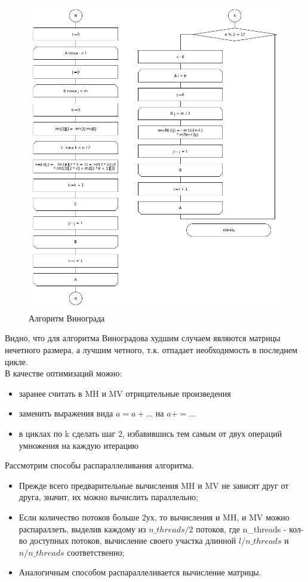 \documentclass[a4paper,12pt]{article}
\begin{document}
	 		\begin{figure}[H]
	 			\centering
	 			{
	 				\includegraphics[scale=0.61]{vinograd2.png}
	 				\caption{\label{ris:vin2}Алгоритм Винограда}	
	 			}
	 		\end{figure}
	
	Видно, что для алгоритма Виноградова худшим случаем являются матрицы нечетного размера, а лучшим четного, т.к. отпадает необходимость в последнем цикле.\\
	В качестве оптимизаций можно:
	\begin{itemize}
	\item заранее считать в MH и MV отрицательные произведения
	\item заменить выражения вида $a = a + ...$ на $a += ...$
	\item в циклах по k сделать шаг 2, избавившись тем самым от двух операций умножения на каждую итерацию
	\end{itemize}
	
	Рассмотрим способы распараллеливания алгоритма. 
	\begin{itemize}
		\item Прежде всего предварительные вычисления MH и MV не зависят друг от друга, значит, их можно вычислить параллельно;
		\item Если количество потоков больше 2ух, то вычисления и MH, и MV можно распараллеть, выделив каждому из $n\_threads/2$ потоков, где n\_threads - кол-во доступных потоков, вычисление своего участка длинной $l/n\_threads$ и $n/n\_threads$ соответственно;
		\item Аналогичным способом распараллеливается вычисление матрицы.
	\end{itemize} 
    
\end{document}
